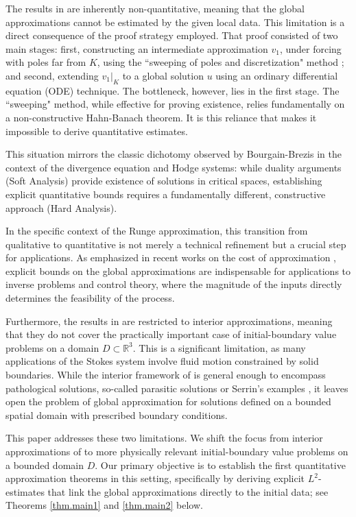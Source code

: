 \documentclass[11pt,a4paper]{article}
\numberwithin{equation}{section}
\newcommand{\R}{\mathbb{R}}
\begin{document}
The results in \cite{HigSue2025} are inherently non-quantitative, meaning that the global approximations cannot be estimated by the given local data. This limitation is a direct consequence of the proof strategy employed. That proof consisted of two main stages: first, constructing an intermediate approximation $v_1$, under forcing with poles far from $K$, using the ``sweeping of poles and discretization" method \cite{Bro1962,EGFPS2019}; and second, extending $v_1|_{K}$ to a global solution $u$ using an ordinary differential equation (ODE) technique. The bottleneck, however, lies in the first stage. The ``sweeping" method, while effective for proving existence, relies fundamentally on a non-constructive Hahn-Banach theorem. It is this reliance that makes it impossible to derive quantitative estimates. 


This situation mirrors the classic dichotomy observed by Bourgain-Brezis \cite{BouBre2003,BouBre2007} in the context of the divergence equation and Hodge systems: while duality arguments (Soft Analysis) provide existence of solutions in critical spaces, establishing explicit quantitative bounds requires a fundamentally different, constructive approach (Hard Analysis).


In the specific context of the Runge approximation, this transition from qualitative to quantitative is not merely a technical refinement but a crucial step for applications. As emphasized in recent works on the cost of approximation \cite{RulSal2019, DebKal2025}, explicit bounds on the global approximations are indispensable for applications to inverse problems and control theory, where the magnitude of the inputs directly determines the feasibility of the process.


Furthermore, the results in \cite{HigSue2025} are restricted to interior approximations, meaning that they do not cover the practically important case of initial-boundary value problems on a domain $D\subset\R^3$. This is a significant limitation, as many applications of the Stokes system involve fluid motion constrained by solid boundaries. While the interior framework of \cite{HigSue2025} is general enough to encompass pathological solutions, so-called parasitic solutions or Serrin's examples \cite{Ser1962}, it leaves open the problem of global approximation for solutions defined on a bounded spatial domain with prescribed boundary conditions.


This paper addresses these two limitations. We shift the focus from interior approximations of \cite{HigSue2025} to more physically relevant initial-boundary value problems on a bounded domain $D$. Our primary objective is to establish the first quantitative approximation theorems in this setting, specifically by deriving explicit $L^2$-estimates that link the global approximations directly to the initial data; see Theorems \ref{thm.main1} and \ref{thm.main2} below.
\end{document}
